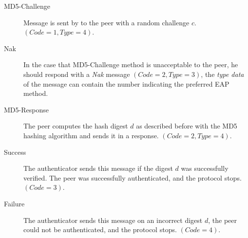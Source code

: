 \begin{description}
	\item [MD5-Challenge] Message is sent by to the peer with a random challenge $c$. $(Code=1, Type=4)$.
	\item [Nak] In the case that MD5-Challenge method is unacceptable to the peer, he should respond with a \textit{Nak} message $(Code=2, Type=3)$, the \textit{type data} of the message can contain the number indicating the preferred EAP method.
	\item [MD5-Response] The peer computes the hash digest $d$ as described before with the MD5 hashing algorithm and sends it in a response. $(Code=2, Type=4)$.
	\item [Success] The authenticator sends this message if the digest $d$ was successfully verified. The peer was successfully authenticated, and the protocol stops. $(Code=3)$.
	\item [Failure] The authenticator sends this message on an incorrect digest $d$, the peer could not be authenticated, and the protocol stops. $(Code=4)$.
\end{description}



































